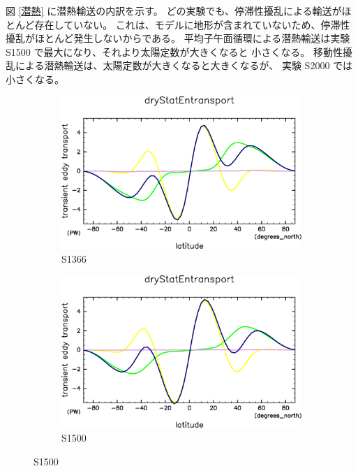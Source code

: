 \documentclass[body]{subfiles}
\begin{document}
図 \ref{潜熱} に潜熱輸送の内訳を示す。
どの実験でも、停滞性擾乱による輸送がほとんど存在していない。
これは、モデルに地形が含まれていないため、停滞性擾乱がほとんど発生しないからである。
平均子午面循環による潜熱輸送は実験 S1500 で最大になり、それより太陽定数が大きくなると
小さくなる。
移動性擾乱による潜熱輸送は、太陽定数が大きくなると大きくなるが、
実験 S2000 では小さくなる。

\begin{figure}[t]
	\centering
	\begin{subfigure}{.4\textwidth}
		\centering
		\includegraphics[width=\columnwidth]{S1366/MeriHeatTrans@dryStatEn,time=14600:14965-crop-rotate.pdf}
		\caption{S1366}\label{乾燥静的エネルギーS1366}
	\end{subfigure}
	\begin{subfigure}{.4\textwidth}
		\centering
		\includegraphics[width=\columnwidth]{S1500/MeriHeatTrans@dryStatEn,time=3650:4015-crop-rotate.pdf}
		\caption{S1500}\label{乾燥静的エネルギーS1500}

\end{subfigure}
\end{figure}
\end{document}
